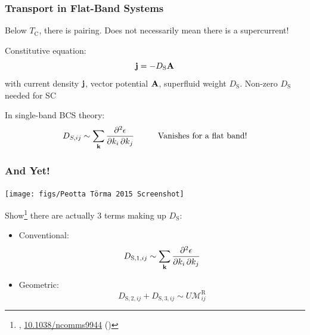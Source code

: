 \documentclass[aspectratio=169]{beamer}
\begin{document}
\begin{frame}
	\frametitle{Transport in Flat-Band Systems}
	
	\begin{block}{}
		\begin{center}
			Below \(T_{\textrm{C}}\), there is pairing.
			Does not necessarily mean there is a supercurrent!
		\end{center}
	\end{block}\pause
	Constitutive equation:
	\begin{equation}
		\mathbf{j} = -D_{\textrm{S}} \mathbf{A}
	\end{equation}
	with current density \(\mathbf{j}\), vector potential \(\mathbf{A}\), superfluid weight \(D_{\textrm{S}}\).
	Non-zero \(D_{\textrm{S}}\) needed for SC\pause
	
	In single-band BCS theory:
	\begin{equation}
		D_{S, ij} \sim \sum_{\mathbf{k}} \pdv{\epsilon}{k_i,k_j} \hspace{1cm} \text{Vanishes for a flat band!}
	\end{equation}
\end{frame}


\begin{frame}
	\frametitle{And Yet!}
	
	\begin{center}
		\texttt{[image: figs/Peotta Törma 2015 Screenshot]}
	\end{center}\pause
	
	Show\footnote<2->[frame]{\footnotesize \citeauthor{peottaSuperfluidityTopologicallyNontrivial2015}, \href{https://doi.org/10.1038/ncomms9944}{10.1038/ncomms9944} (\citeyear{peottaSuperfluidityTopologicallyNontrivial2015})} there are actually 3 terms making up \(D_{\textrm{S}}\):
	
	\begin{itemize}
		\item Conventional:
		\begin{equation}
			D_{\textrm{S}, 1, ij} \sim \sum_{\mathbf{k}} \pdv{\epsilon}{k_i,k_j}
		\end{equation}\pause
		\item Geometric: 
		\begin{equation}
			D_{\textrm{S}, 2, ij} + D_{\textrm{S}, 3, ij} \sim U \mathcal{M}_{ij}^{\textrm{R}}
		\end{equation}
	\end{itemize}
\end{frame}
\end{document}
